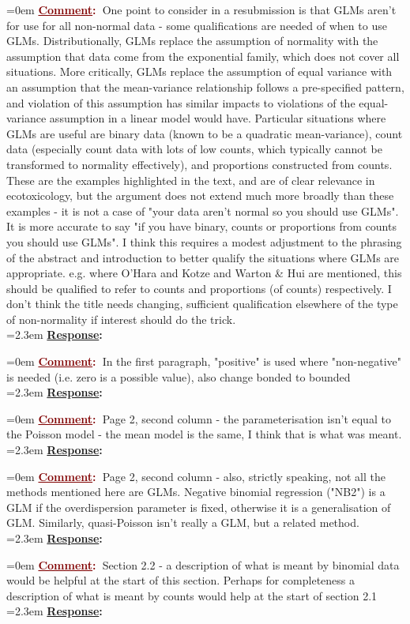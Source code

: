 \documentclass[12pt]{article}
\newcommand{\comment}[0]{\vspace{1em} \noindent \hangindent=0em \textbf{\textcolor{Maroon}{\uline{Comment}:~}}}
\newcommand{\response}[0]{\\\vspace{0.1em} \hangindent=2.3em \textbf{\textcolor{NavyBlue}{\uline{Response}:~}}}
\begin{document}
\comment One point to consider in a resubmission is that GLMs aren't for use for all non-normal data - some qualifications are needed of when to use GLMs.  Distributionally, GLMs replace the assumption of normality with the assumption that data come from the exponential family, which does not cover all situations.  More critically, GLMs replace the assumption of equal variance with an assumption that the mean-variance relationship follows a pre-specified pattern, and violation of this assumption has similar impacts to violations of the equal-variance assumption in a linear model would have.  Particular situations where GLMs are useful are binary data (known to be a quadratic mean-variance), count data (especially count data with lots of low counts, which typically cannot be transformed to normality effectively), and proportions constructed from counts.  These are the examples highlighted in the text, and are of clear relevance in ecotoxicology, but the argument does not extend much
more broadly than these examples - it is not a case of "your data aren't normal so you should use GLMs".  It is more accurate to say "if you have binary, counts or proportions from counts you should use GLMs".  I think this requires a modest adjustment to the phrasing of the abstract and introduction to better qualify the situations where GLMs are appropriate.  e.g. where O'Hara and Kotze and Warton \& Hui are mentioned, this should be qualified to refer to counts and proportions (of counts) respectively.  I  don't think the title needs changing, sufficient qualification elsewhere of the type of non-normality if interest should do the trick.
\response

\comment In the first paragraph, "positive" is used where "non-negative" is needed (i.e. zero is a possible value), also change bonded to bounded
\response 

\comment Page 2, second column - the parameterisation isn't equal to the Poisson model - the mean model is the same, I think that is what was meant.
\response 

\comment Page 2, second column - also, strictly speaking, not all the methods mentioned here are GLMs.  Negative binomial regression ("NB2") is a GLM if the overdispersion parameter is fixed, otherwise it is a generalisation of GLM.  Similarly, quasi-Poisson isn't really a GLM, but a related method.
\response

\comment Section 2.2 - a description of what is meant by binomial data would be helpful at the start of this section.  Perhaps for completeness a description of what is meant by counts would help at the start of section 2.1
\response
\end{document}
